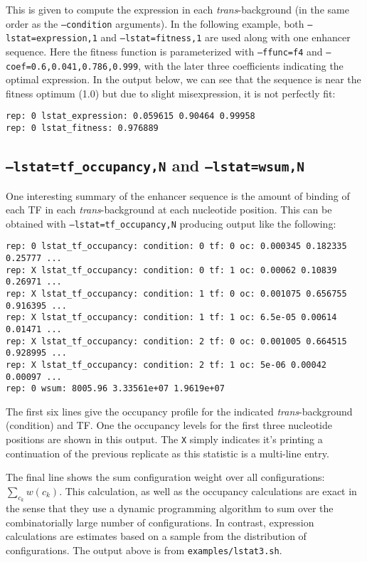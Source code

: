 \documentclass[11pt]{article}
\begin{document}
This is given to compute the expression in each \emph{trans}-background (in the same order as the \texttt{--condition} arguments). In the following example, both \texttt{--lstat=expression,1} and \texttt{--lstat=fitness,1} are used along with one enhancer sequence. Here the fitness function is parameterized with \texttt{--ffunc=f4} and \texttt{--coef=0.6,0.041,0.786,0.999}, with the later three coefficients indicating the optimal expression. In the output below, we can see that the sequence is near the fitness optimum (1.0) but due to slight misexpression, it is not perfectly fit:

\begin{verbatim}
rep: 0 lstat_expression: 0.059615 0.90464 0.99958
rep: 0 lstat_fitness: 0.976889
\end{verbatim}

\subsection{\texttt{--lstat=tf\_occupancy,N} and \texttt{--lstat=wsum,N}}

One interesting summary of the enhancer sequence is the amount of binding of each TF in each \emph{trans}-background at each nucleotide position. This can be obtained with \texttt{--lstat=tf\_occupancy,N} producing output like the following:

\begin{verbatim}
rep: 0 lstat_tf_occupancy: condition: 0 tf: 0 oc: 0.000345 0.182335 0.25777 ...
rep: X lstat_tf_occupancy: condition: 0 tf: 1 oc: 0.00062 0.10839 0.26971 ...
rep: X lstat_tf_occupancy: condition: 1 tf: 0 oc: 0.001075 0.656755 0.916395 ...
rep: X lstat_tf_occupancy: condition: 1 tf: 1 oc: 6.5e-05 0.00614 0.01471 ...
rep: X lstat_tf_occupancy: condition: 2 tf: 0 oc: 0.001005 0.664515 0.928995 ...
rep: X lstat_tf_occupancy: condition: 2 tf: 1 oc: 5e-06 0.00042 0.00097 ...
rep: 0 wsum: 8005.96 3.33561e+07 1.9619e+07
\end{verbatim}

\noindent The first six lines give the occupancy profile for the indicated \emph{trans}-background (condition) and TF. One the occupancy levels for the first three nucleotide positions are shown in this output. The \texttt{X} simply indicates it's printing a continuation of the previous replicate as this statistic is a multi-line entry.

The final line shows the sum configuration weight over all configurations: $\sum_{c_k} w(c_k)$. This calculation, as well as the occupancy calculations are exact in the sense that they use a dynamic programming algorithm to sum over the combinatorially large number of configurations. In contrast, expression calculations are estimates based on a sample from the distribution of configurations. The output above is from \texttt{examples/lstat3.sh}.
\end{document}
